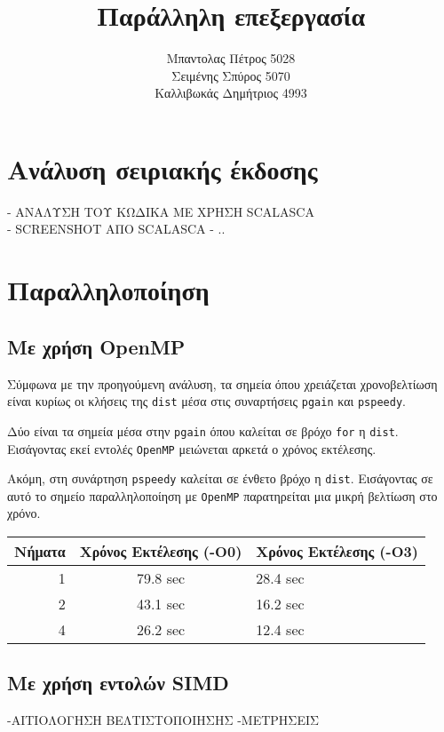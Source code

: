 \documentclass{article}
\title{Παράλληλη επεξεργασία}
\author{Μπαντολας Πέτρος 5028\\Σειμένης Σπύρος 5070\\Καλλιβωκάς Δημήτριος 4993}
\begin{document}
\maketitle
\section{Ανάλυση σειριακής έκδοσης}
- ΑΝΑΛΥΣΗ ΤΟΥ ΚΩΔΙΚΑ ΜΕ ΧΡΗΣΗ SCALASCA\\
- SCREENSHOT ΑΠΟ SCALASCA
- ..

\section{Παραλληλοποίηση}
\subsection{Με χρήση OpenMP}
Σύμφωνα με την προηγούμενη ανάλυση, τα σημεία όπου χρειάζεται χρονοβελτίωση είναι κυρίως οι κλήσεις της \texttt{dist} μέσα στις συναρτήσεις \texttt{pgain} και \texttt{pspeedy}.

Δύο είναι τα σημεία μέσα στην \texttt{pgain} όπου καλείται σε βρόχο \texttt{for} η \texttt{dist}. Εισάγοντας εκεί εντολές \texttt{OpenMP} μειώνεται αρκετά ο χρόνος εκτέλεσης.

Ακόμη, στη συνάρτηση \texttt{pspeedy} καλείται σε ένθετο βρόχο η \texttt{dist}. Εισάγοντας σε αυτό το σημείο παραλληλοποίηση με \texttt{OpenMP} παρατηρείται μια μικρή βελτίωση στο χρόνο.

\begin{center}
\begin{tabular}{|r|c|l|}
    \hline
    Νήματα & Χρόνος Εκτέλεσης (-Ο0) & Χρόνος Εκτέλεσης (-Ο3) \\ \hline
    1 & 79.8 sec & 28.4 sec \\
    2 & 43.1 sec & 16.2 sec \\
    4 & 26.2 sec & 12.4 sec \\ \hline
\end{tabular}
\end{center}

\subsection{Με χρήση εντολών SIMD}
-ΑΙΤΙΟΛΟΓΗΣΗ ΒΕΛΤΙΣΤΟΠΟΙΗΣΗΣ
-ΜΕΤΡΗΣΕΙΣ
\end{document}
